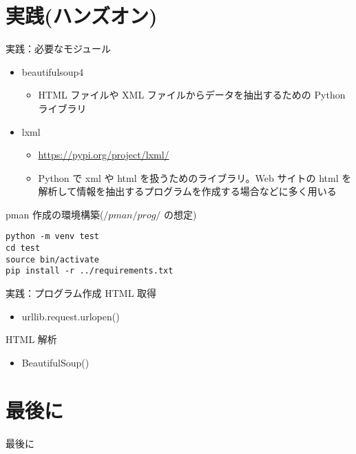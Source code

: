 \documentclass[compress,dvipdfmx,11pt]{beamer}
\begin{document}
\section{実践(ハンズオン)}
\label{sec:orge35abc4}
\begin{frame}[label={sec:org6934607},fragile]{実践：必要なモジュール}
 \begin{itemize}
\item beautifulsoup4
\begin{itemize}
\item HTML ファイルや XML ファイルからデータを抽出するための Python ライブラリ
\end{itemize}
\item lxml
\begin{itemize}
\item \url{https://pypi.org/project/lxml/}
\item Python で xml や html を扱うためのライブラリ。Web サイトの html を
解析して情報を抽出するプログラムを作成する場合などに多く用いる
\end{itemize}
\end{itemize}

pman 作成の環境構築(\(/pman/prog/\) の想定)
\begin{verbatim}
python -m venv test
cd test
source bin/activate
pip install -r ../requirements.txt
\end{verbatim}
\end{frame}

\begin{frame}[label={sec:org6a722f9}]{実践：プログラム作成}
HTML 取得
\begin{itemize}
\item urllib.request.urlopen()
\end{itemize}


HTML 解析
\begin{itemize}
\item BeautifulSoup()
\end{itemize}
\end{frame}

\section{最後に}
\label{sec:orgc778780}
\begin{frame}[label={sec:orgfa5e01c}]{最後に}
\end{frame}
\end{document}
